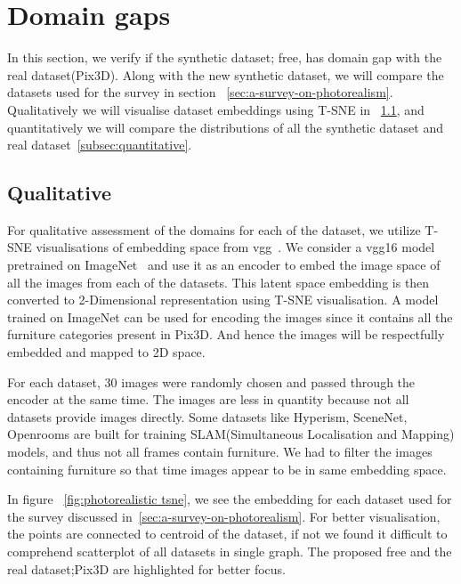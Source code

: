 \section{Domain gaps}\label{sec:domain-gaps}

In this section, we verify if the synthetic dataset;
\gls{free}, has domain gap with the real dataset(Pix3D).
Along with the new synthetic dataset, we will compare the datasets used for the survey in section ~\ref{sec:a-survey-on-photorealism}.
Qualitatively we will visualise dataset embeddings using T-SNE in ~\ref{subsec:qualitative}, and quantitatively we will compare the distributions of all the synthetic dataset and real dataset~\ref{subsec:quantitative}.

\subsection{Qualitative}\label{subsec:qualitative}

For qualitative assessment of the domains for each of the dataset, we utilize T-SNE visualisations of embedding space from \gls{vgg}~\cite{simonyan2015deep}.
We consider a \gls{vgg}16 model pretrained on ImageNet~\cite{Deng2009ImageNetAL} and use it as an encoder to embed the image space of all the images from each of the datasets.
This latent space embedding is then converted to 2-Dimensional representation using T-SNE visualisation.
A model trained on ImageNet can be used for encoding the images since it contains all the furniture categories present in Pix3D\@.
And hence the images will be respectfully embedded and mapped to 2D space.

For each dataset, 30 images were randomly chosen and passed through the encoder at the same time.
The images are less in quantity because not all datasets provide images directly.
Some datasets like Hyperism, SceneNet, Openrooms are built for training SLAM(Simultaneous Localisation and Mapping) models, and thus not all frames contain furniture.
We had to filter the images containing furniture so that time images appear to be in same embedding space.

In figure ~\ref{fig:photorealistic tsne}, we see the embedding for each dataset used for the survey discussed in~\ref{sec:a-survey-on-photorealism}.
For better visualisation, the points are connected to centroid of the dataset,
if not we found it difficult to comprehend scatterplot of all datasets in single graph.
The proposed \gls{free} and the real dataset;Pix3D are highlighted for better focus.


